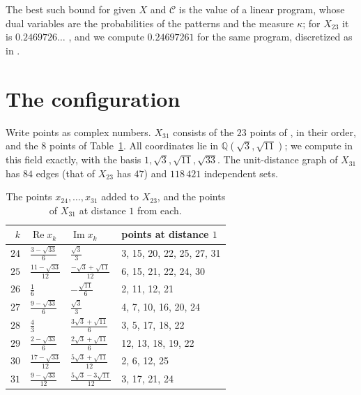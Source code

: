 \documentclass[11pt,a4paper]{amsart}
\theoremstyle{remark}
\newcommand{\Q}{\mathbb{Q}}
\newcommand{\NPTS}{31}
\newcommand{\NNEW}{8}
\newcommand{\NUNIT}{84}
\newcommand{\NATOMS}{118\,421}
\begin{document}
The best such bound for given $X$ and $\mathcal C$ is the value of a linear program, whose dual variables are the
probabilities of the patterns and the measure $\kappa$; for $X_{23}$ it is $0.2469726\ldots$ \cite[§8]{ACMVZ}, and we
compute $0.24697261$ for the same program, discretized as in \cite{ACMVZ}.

\section{The configuration}\label{sec:config}

Write points as complex numbers. $X_{\NPTS}$ consists of the $23$ points of \cite[Table~1]{ACMVZ}, in their order, and the
$\NNEW$ points of Table~\ref{tab:new}. All coordinates lie in $\Q(\sqrt3,\sqrt{11})$; we compute in this field exactly,
with the basis $1,\sqrt3,\sqrt{11},\sqrt{33}$. The unit-distance graph of $X_{\NPTS}$ has $\NUNIT$ edges (that of $X_{23}$
has $47$) and $\NATOMS$ independent sets.

\begin{table}[ht]
\centering
\renewcommand{\arraystretch}{1.35}
\begin{tabular}{rlll}
\toprule
$k$ & $\operatorname{Re}x_k$ & $\operatorname{Im}x_k$ & points at distance $1$\\
\midrule
$24$ & $\frac{3-\sqrt{33}}{6}$ & $\frac{\sqrt3}{3}$ & 3, 15, 20, 22, 25, 27, 31 \\
$25$ & $\frac{11-\sqrt{33}}{12}$ & $\frac{-\sqrt3+\sqrt{11}}{12}$ & 6, 15, 21, 22, 24, 30 \\
$26$ & $\frac{1}{6}$ & $-\frac{\sqrt{11}}{6}$ & 2, 11, 12, 21 \\
$27$ & $\frac{9-\sqrt{33}}{6}$ & $\frac{\sqrt3}{3}$ & 4, 7, 10, 16, 20, 24 \\
$28$ & $\frac{4}{3}$ & $\frac{3\sqrt3+\sqrt{11}}{6}$ & 3, 5, 17, 18, 22 \\
$29$ & $\frac{2-\sqrt{33}}{6}$ & $\frac{2\sqrt3+\sqrt{11}}{6}$ & 12, 13, 18, 19, 22 \\
$30$ & $\frac{17-\sqrt{33}}{12}$ & $\frac{5\sqrt3+\sqrt{11}}{12}$ & 2, 6, 12, 25 \\
$31$ & $\frac{9-\sqrt{33}}{12}$ & $\frac{5\sqrt3-3\sqrt{11}}{12}$ & 3, 17, 21, 24 \\
\bottomrule
\end{tabular}
\caption{The points $x_{24},\dots,x_{31}$ added to $X_{23}$, and the points of $X_{31}$ at distance $1$ from each.}\label{tab:new}
\end{table}
\end{document}

